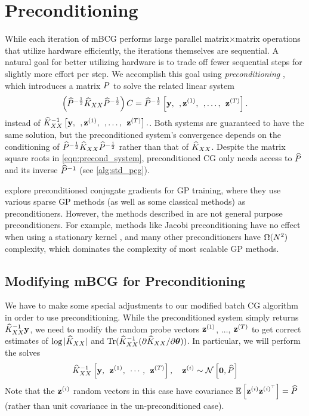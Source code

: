 \section{Preconditioning}
\label{sec:preconditioning}

While each iteration of mBCG performs large parallel matrix$\times$matrix operations that utilize hardware efficiently, the iterations themselves are sequential.
A natural goal for better utilizing hardware is to trade off fewer sequential steps for slightly more effort per step.
We accomplish this goal using \emph{preconditioning} \citep[e.g.][]{demmel1997applied,saad2003iterative,van2003iterative,golub2012matrix}, which introduces a matrix $P$ to solve the related linear system
\begin{equation}
  \left( \widehat{P}^{- \frac 1 2} \widehat{K}_{XX} \widehat{P}^{- \frac 1 2}\right) C = \widehat{P}^{- \frac 1 2} \left[ \mathbf{y}, \:\:, \mathbf{z}^{(1)}, \:\:, \ldots, \:\: \mathbf{z}^{(T)} \right].
  \label{eqn:precond_system}
\end{equation}
instead of $\widehat{K}_{XX}^{-1} \left[  \mathbf{y}, \:\:, \mathbf{z}^{(1)}, \:\:, \ldots, \:\: \mathbf{z}^{(T)} \right].$.
Both systems are guaranteed to have the same solution, but the preconditioned system's convergence depends on the conditioning of $\widehat{P}^{- \frac 1 2} \widehat{K}_{XX} \widehat{P}^{- \frac 1 2}$ rather than that of $\widehat{K}_{XX}$.
Despite the matrix square roots in \cref{eqn:precond_system}, preconditioned CG only needs access to $\widehat{P}$ and its inverse $\widehat{P}^{-1}$ (see \cref{alg:std_pcg}).

\citet{cutajar2016preconditioning} explore preconditioned conjugate gradients for GP training, where they use various sparse GP methods (as well as some classical methods) as preconditioners.
However, the methods described in \citet{cutajar2016preconditioning} are not general purpose preconditioners.
For example, methods like Jacobi preconditioning have no effect when using a stationary kernel \cite{cutajar2016preconditioning,wilson2015thoughts}, and many other preconditioners have $\bigomega{N^{2}}$ complexity, which dominates the complexity of most scalable GP methods.

\subsection{Modifying mBCG for Preconditioning}
We have to make some special adjustments to our modified batch CG algorithm in order to use preconditioning.
While the preconditioned system simply returns $\widehat{K}_{XX}^{-1} \mathbf{y}$, we need to modify the random probe vectors $\mathbf{z}^{(1)}$, $\ldots$, $\mathbf{z}^{(T)}$ to get correct estimates of $\log \vert \widehat{K}_{XX} \vert$ and $\tr{ \trainK^{-1} ( \partial \trainK / \partial \btheta) }$.
In particular, we will perform the solves
%
\begin{equation}
  \label{eqn:mod_cg_call}
  \widehat{K}_{XX}^{-1} \left[ \mathbf{y}, \:\: \mathbf{z}^{(1)}, \:\: \cdots, \:\: \mathbf{z}^{(T)} \right], \quad \mathbf{z}^{(i)} \sim \mathcal{N} \left[ \mathbf{0}, \widehat{P} \right]
\end{equation}
%
Note that the $\mathbf{z}^{(i)}$ random vectors in this case have covariance $\operatorname*{\mathbb{E}} \left[  \mathbf{z}^{(i)} \mathbf{z}^{(i)^\top}  \right] = \widehat{P}$ (rather than unit covariance in the un-preconditioned case).

